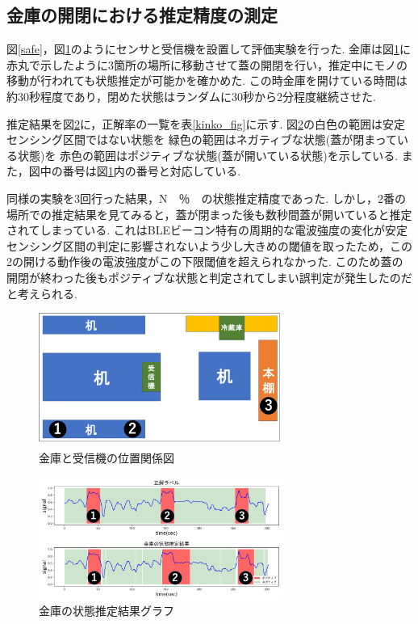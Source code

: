 \documentclass[Japanese]{dicomopapers}
\begin{document}
\subsection{金庫の開閉における推定精度の測定}
図\ref{safe}，図\ref{kinko_position}のようにセンサと受信機を設置して評価実験を行った.
金庫は図\ref{kinko_position}に赤丸で示したように3箇所の場所に移動させて蓋の開閉を行い，推定中にモノの移動が行われても状態推定が可能かを確かめた.
この時金庫を開けている時間は約30秒程度であり，閉めた状態はランダムに30秒から2分程度継続させた.

推定結果を図\ref{kinko_graph}に，正解率の一覧を表\ref{kinko_fig}に示す.
図\ref{kinko_graph}の白色の範囲は安定センシング区間ではない状態を 緑色の範囲はネガティブな状態(蓋が閉まっている状態)を 赤色の範囲はポジティブな状態(蓋が開いている状態)を示している.
また，図中の番号は図\ref{kinko_position}内の番号と対応している.

同様の実験を3回行った結果，N　％　の状態推定精度であった.
しかし，2番の場所での推定結果を見てみると，蓋が閉まった後も数秒間蓋が開いていると推定されてしまっている.
これはBLEビーコン特有の周期的な電波強度の変化が安定センシング区間の判定に影響されないよう少し大きめの閾値を取ったため，この2の開ける動作後の電波強度がこの下限閾値を超えられなかった.
このため蓋の開閉が終わった後もポジティブな状態と判定されてしまい誤判定が発生したのだと考えられる.

\begin{figure}[ht]
    \centering
    \includegraphics[width=8cm]{kinko_position_fig.png}
    \caption{金庫と受信機の位置関係図}
    \label{kinko_position}
\end{figure}

\begin{figure}[ht]
    \centering
    \includegraphics[width=8cm]{kinko_graph.png}
    \caption{金庫の状態推定結果グラフ}
    \label{kinko_graph}
\end{figure}
\end{document}
